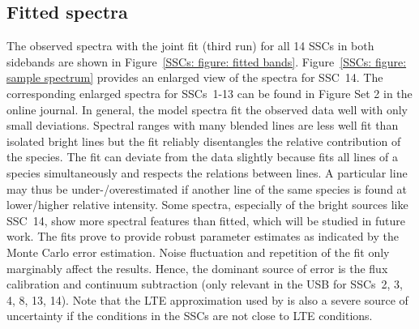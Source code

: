 \subsection{Fitted spectra}\label{SSCs: section: fitted spectra}

The observed spectra with the joint fit (third run) for all 14 SSCs in both sidebands are shown in Figure~\ref{SSCs: figure: fitted bands}. Figure~\ref{SSCs: figure: sample spectrum} provides an enlarged view of the spectra for SSC~14. 
The corresponding enlarged spectra for SSCs~1-13 can be found in Figure Set 2 in the online journal.
In general, the model spectra fit the observed data well with only small deviations. Spectral ranges with many blended lines are less well fit than isolated bright lines but the fit reliably disentangles the relative contribution of the species. 
The fit can deviate from the data slightly because \xclass fits all lines of a species simultaneously and respects the relations between lines. A particular line may thus be under-/overestimated if another line of the same species is found at lower/higher relative intensity. 
Some spectra, especially of the bright sources like SSC~14, show more spectral features than fitted, which will be studied in future work.
The fits prove to provide robust parameter estimates as indicated by the Monte Carlo error estimation. Noise fluctuation and repetition of the fit only marginably affect the results. Hence, the dominant source of error is the flux calibration and continuum subtraction (only relevant in the USB for SSCs~2, 3, 4, 8, 13, 14). Note that
the LTE approximation used by \xclass is also a severe source of uncertainty if the conditions in the SSCs are not close to LTE conditions.




